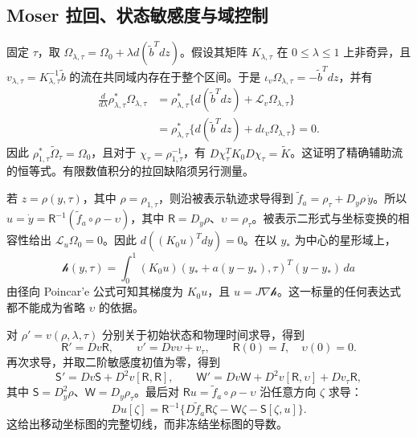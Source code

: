 \subsection{Moser 拉回、状态敏感度与域控制}
固定 $\tau$，取 $\Omega_{\lambda,\tau}=\Omega_0+\lambda d(\widetilde b^Tdz)$。假设其矩阵 $K_{\lambda,\tau}$ 在 $0\le\lambda\le1$ 上非奇异，且 $v_{\lambda,\tau}=K_{\lambda,\tau}^{-1}\widetilde b$ 的流在共同域内存在于整个区间。于是 $\iota_v\Omega_{\lambda,\tau}=-\widetilde b^Tdz$，并有
\begin{align}
 \frac{d}{d\lambda}\rho_{\lambda,\tau}^*\Omega_{\lambda,\tau}
 &=\rho_{\lambda,\tau}^*
   \{d(\widetilde b^Tdz)+\mathcal L_v\Omega_{\lambda,\tau}\}\\
 &=\rho_{\lambda,\tau}^*\{d(\widetilde b^Tdz)+d\iota_v\Omega_{\lambda,\tau}\}=0.
 \label{eq:sup-moser-proof}
\end{align}
因此 $\rho_{1,\tau}^*\widetilde\Omega_\tau=\Omega_0$，且对于 $\chi_\tau=\rho_{1,\tau}^{-1}$，有 $D\chi_\tau^TK_0D\chi_\tau=\widetilde K$。这证明了精确辅助流的恒等式。有限数值积分的拉回缺陷须另行测量。

若 $z=\rho(y,\tau)$，其中 $\rho=\rho_{1,\tau}$，则沿被表示轨迹求导得到
$\widetilde f_a=\rho_\tau+D_y\rho\,\dot y$。所以 $u=\dot y=\mathsf R^{-1}(\widetilde f_a\circ\rho-\upsilon)$，其中 $\mathsf R=D_y\rho$、$\upsilon=\rho_\tau$。被表示二形式与坐标变换的相容性给出 $\mathcal L_u\Omega_0=0$。因此 $d((K_0u)^Tdy)=0$。在以 $y_*$ 为中心的星形域上，
\begin{equation}
 \mathcal h(y,\tau)=\int_0^1 (K_0u)(y_*+a(y-y_*),\tau)^T(y-y_*)\,da
 \label{eq:sup-chart-hamiltonian}
\end{equation}
由径向 Poincar'e 公式可知其梯度为 $K_0u$，且 $u=J\nabla\mathcal h$。这一标量的任何表达式都不能成为省略 $\upsilon$ 的依据。

对 $\rho'=v(\rho,\lambda,\tau)$ 分别关于初始状态和物理时间求导，得到
\begin{equation}
 \mathsf R'=Dv\mathsf R,\qquad
 \upsilon'=Dv\upsilon+v_\tau,\qquad
 \mathsf R(0)=I,\quad\upsilon(0)=0.
 \label{eq:sup-first-sensitivity}
\end{equation}
再次求导，并取二阶敏感度初值为零，得到
\begin{equation}
 \mathsf S'=Dv\mathsf S+D^2v[\mathsf R,\mathsf R],\qquad
 \mathsf W'=Dv\mathsf W+D^2v[\mathsf R,\upsilon]+Dv_\tau\mathsf R,
 \label{eq:sup-second-sensitivity}
\end{equation}
其中 $\mathsf S=D_y^2\rho$、$\mathsf W=D_y\rho_\tau$。最后对 $\mathsf R u=\widetilde f_a\circ\rho-\upsilon$ 沿任意方向 $\zeta$ 求导：
\begin{equation}
 Du[\zeta]=\mathsf R^{-1}
 \{D\widetilde f_a\mathsf R\zeta-\mathsf W\zeta-\mathsf S[\zeta,u]\}.
 \label{eq:sup-chart-tangent}
\end{equation}
这给出移动坐标图的完整切线，而非冻结坐标图的导数。

